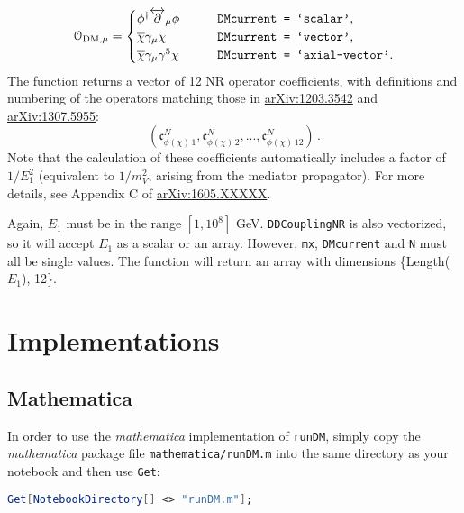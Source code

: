 \documentclass[notitlepage,12pt]{article}
\newcommand{\ourpaper}{\href{http://arxiv.org/abs/1605.XXXXX}{arXiv:1605.XXXXX}\xspace}
\begin{document}
\begin{equation}
\mathcal{O}_{\mathrm{DM}, \mu} = 
\begin{cases}
\phi^\dagger \overleftrightarrow{\partial}_\mu \phi & \qquad \text{\texttt{DMcurrent = `scalar'},}\\
\overline{\chi} \gamma_\mu \chi & \qquad \text{\texttt{DMcurrent = `vector'},}\\
\overline{\chi} \gamma_\mu \gamma^5 \chi & \qquad \text{\texttt{DMcurrent = `axial-vector'}.}\\
\end{cases}
\end{equation}
The function returns a vector of 12 NR operator coefficients, with definitions and numbering of the operators matching those in \href{http://arxiv.org/abs/1203.3542}{arXiv:1203.3542} and \href{http://arxiv.org/abs/1307.5955}{arXiv:1307.5955}:
\begin{equation}
\left(\mathfrak{c}_{\phi(\chi) \, 1}^{N}, \mathfrak{c}_{\phi(\chi) \, 2}^{N}, ..., \mathfrak{c}_{\phi(\chi) \, 12}^{N}\right) \,.
\end{equation}
Note that the calculation of these coefficients automatically includes a factor of $1/E_1^2$ (equivalent to $1/m_V^2$, arising from the mediator propagator). For more details, see Appendix C of \ourpaper.

Again, $E_1$ must be in the range $[1, 10^8]$ GeV. \texttt{DDCouplingNR} is also vectorized, so it will accept $E_1$ as a scalar or an array.  However, \texttt{mx}, \texttt{DMcurrent} and \texttt{N} must all be single values. The function will return an array with dimensions \{Length($E_1$), 12\}.
\section{Implementations}
\label{sec:implementations}

\subsection{Mathematica}

In order to use the \textit{mathematica} implementation of \texttt{runDM}, simply copy the \textit{mathematica} package file \texttt{mathematica/runDM.m} into the same directory as your notebook and then use \texttt{Get}:

\begin{lstlisting}[language=mathematica]
Get[NotebookDirectory[] <> "runDM.m"];
\end{lstlisting}
\end{document}
